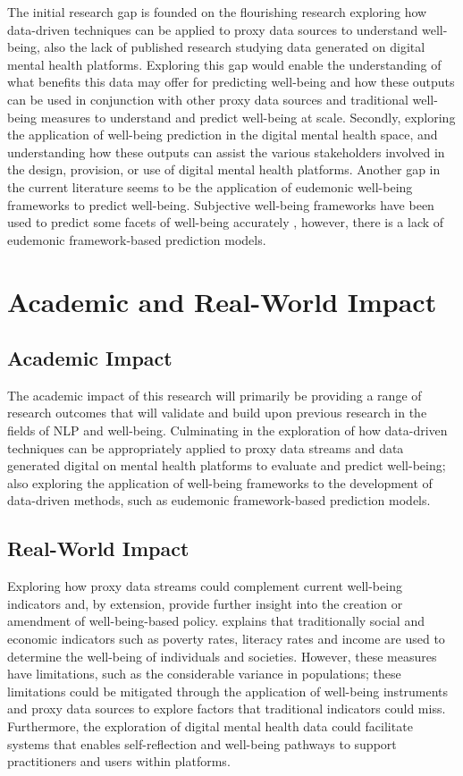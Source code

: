 \documentclass[12pt]{article}
\begin{document}
The initial research gap is founded on the flourishing research exploring how data-driven techniques can be applied to proxy data sources to understand well-being, also the lack of published research studying data generated on digital mental health platforms. Exploring this gap would enable the understanding of what benefits this data may offer for predicting well-being and how these outputs can be used in conjunction with other proxy data sources and traditional well-being measures to understand and predict well-being at scale. Secondly, exploring the application of well-being prediction in the digital mental health space, and understanding how these outputs can assist the various stakeholders involved in the design, provision, or use of digital mental health platforms.
Another gap in the current literature seems to be the application of eudemonic well-being frameworks to predict well-being. Subjective well-being frameworks have been used to predict some facets of well-being accurately \parencite{kjell_natural_2022, jaidka_estimating_2020}, however, there is a lack of eudemonic framework-based prediction models.

\section{Academic and Real-World Impact}
\subsection{Academic Impact}
The academic impact of this research will primarily be providing a range of research outcomes that will validate and build upon previous research in the fields of NLP and well-being. Culminating in the exploration of how data-driven techniques can be appropriately applied to proxy data streams and data generated digital on mental health platforms to evaluate and predict well-being; also exploring the application of well-being frameworks to the development of data-driven methods, such as eudemonic framework-based prediction models.
\subsection{Real-World Impact}
Exploring how proxy data streams could complement current well-being indicators and, by extension, provide further insight into the creation or amendment of well-being-based policy. \textcite{2009Wfpp} explains that traditionally social and economic indicators such as poverty rates, literacy rates and income are used to determine the well-being of individuals and societies. However, these measures have limitations, such as the considerable variance in populations; these limitations could be mitigated through the application of well-being instruments and proxy data sources to explore factors that traditional indicators could miss. Furthermore, the exploration of digital mental health data could facilitate systems that enables self-reflection and well-being pathways to support practitioners and users within platforms.
\end{document}
